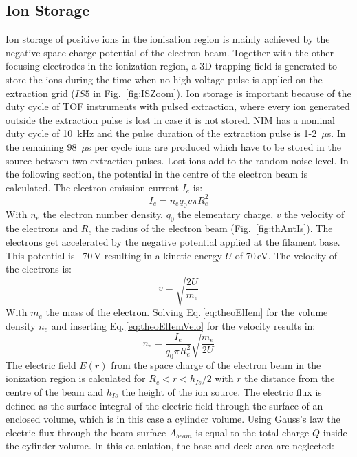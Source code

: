 		
	\subsection{Ion Storage }\label{chap:TheoIonStor}
	Ion storage of positive ions in the ionisation region is mainly achieved by the negative space charge potential of the electron beam. Together with the other focusing electrodes in the ionization region, a 3D trapping field is generated to store the ions during the time when no high-voltage pulse is applied on the extraction grid ($IS5$ in Fig.~\ref{fig:ISZoom}). Ion storage is important because of the duty cycle of TOF instruments with pulsed extraction, where every ion generated outside the extraction pulse is lost in case it is not stored. NIM has a nominal duty cycle of 10~kHz and the pulse duration of the extraction pulse is 1-2~$\mu$s. In the remaining 98~$\mu$s per cycle ions are produced which have to be stored in the source between two extraction pulses. Lost ions add to the random noise level. In the following section, the potential in the centre of the electron beam is calculated. The electron emission current $I_{e}$ is:
	\begin{equation}
		I_{e} = n_e q_0 v\pi R_e^2
		\label{eq:theoElIem}
	\end{equation}
	With $n_e$ the electron number density, $q_0$ the elementary charge, $v$ the velocity of the electrons and $R_e$ the radius of the electron beam (Fig.~\ref{fig:thAntIs}). The electrons get accelerated by the negative potential applied at the filament base. This potential is --70\,\si{\volt} resulting in a kinetic energy $U$ of 70\,\si{\electronvolt}. The velocity of the electrons is:
	\begin{equation}
		v = \sqrt{\frac{2 U}{m_e}}
		\label{eq:theoElIemVelo}
	\end{equation}
	With $m_e$ the mass of the electron. Solving Eq.\,\eqref{eq:theoElIem} for the volume density $n_e$ and inserting Eq.\,\eqref{eq:theoElIemVelo} for the velocity results in:
	\begin{equation}
		n_e = \frac{I_e}{q_0 \pi R_e^2}\sqrt{\frac{m_e}{2U}}
		\label{eq:theoElIemNe}
	\end{equation}
	The electric field $E(r)$ from the space charge of the electron beam in the ionization region is calculated for $R_e<r<h_{Is}/2$ with $r$ the distance from the centre of the beam and $h_{Is}$ the height of the ion source. The electric flux is defined as the surface integral of the electric field through the surface of an enclosed volume, which is in this case a cylinder volume. Using Gauss's law the electric flux through the beam surface $A_{beam}$ is equal to the total charge $Q$ inside the cylinder volume. In this calculation, the base and deck area are neglected:
